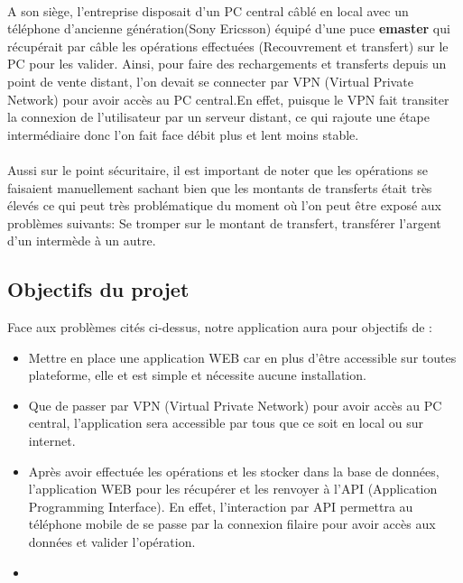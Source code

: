 		\paragraph{}A son siège, l'entreprise disposait d'un PC central câblé en local avec un téléphone d'ancienne génération(Sony Ericsson) équipé d'une puce \textbf{emaster} qui récupérait par câble les opérations effectuées (Recouvrement et transfert) sur le PC pour les valider. Ainsi, pour faire des rechargements et transferts depuis un point de vente distant, l'on devait se connecter par VPN (Virtual Private Network) pour avoir accès au PC central.En effet, puisque le VPN fait transiter la connexion de l'utilisateur par un serveur distant, ce qui rajoute une étape intermédiaire donc l'on fait face débit plus et lent moins stable.
		\paragraph{}Aussi sur le point sécuritaire, il est important de noter que les opérations se faisaient manuellement sachant bien que les montants de transferts était très élevés ce qui peut très problématique du moment où l'on peut être exposé aux problèmes suivants: Se tromper sur le montant de transfert, transférer l'argent d'un intermède	à un autre.\\
		
\subsection{Objectifs du projet}
	Face aux problèmes cités ci-dessus, notre application aura pour objectifs de :
	\begin{itemize}
		
		\item Mettre en place une application WEB car en plus d’être accessible sur toutes plateforme, elle et est simple et nécessite aucune installation.\\
		
		\item Que de passer par VPN (Virtual Private Network) pour avoir accès au PC central, l’application sera accessible par tous que ce soit en local ou sur internet.\\
		
		\item Après avoir effectuée les opérations et les stocker dans la base de données, l’application WEB pour les récupérer et les renvoyer à l’API (Application Programming Interface). En effet, l’interaction par API permettra au téléphone mobile de se passe par la connexion filaire pour avoir accès aux données et valider l'opération.
		
		\item 
		
	\end{itemize}
